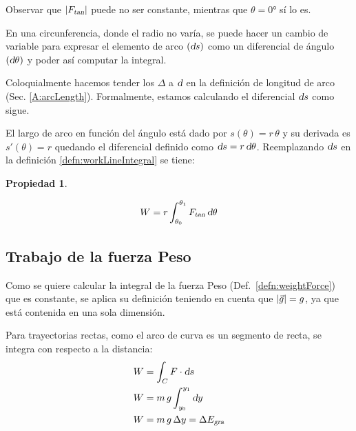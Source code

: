 \documentclass[a5paper,12pt,twoside]{book}
\newtheorem{prop}{{Propiedad}}[chapter]
\begin{document}
Observar que ${\left| {{{F}_\textsl{{tan}}}} \right|}$ puede no ser constante, mientras que $\theta=\ang{0}$ sí lo es.

En una circunferencia, donde el radio no varía, se puede hacer un cambio de variable para expresar el elemento de arco $(\textsl{d} s)$ como un diferencial de ángulo $(\textsl{d} \theta)$ y poder así computar la integral.

Coloquialmente hacemos tender los $\Delta$ a $\textsl{d}$ en la definición de longitud de arco (Sec. \ref{A:arcLength}). Formalmente, estamos calculando el diferencial $\textsl{d} s$ como sigue.

El largo de arco en función del ángulo está dado por $s(\theta) = r \, \theta$ y su derivada es $s'(\theta) = r$ quedando el diferencial definido como $\textsl{d} s = r \, \textsl{d} \theta$. Reemplazando $\textsl{d} s$ en la definición \ref{defn:workLineIntegral} se tiene:

\begin{mdframed}[style=MyFrame1]
    \begin{prop}
        \label{prop:workOnCircumference}
    \end{prop}
    \begin{equation*}
        W = r \int_{\theta_0}^{\theta_1} {{F}_\textsl{{tan}}} \, \textsl{d} \theta
    \end{equation*}
\end{mdframed}


\subsection{Trabajo de la fuerza Peso}

Como se quiere calcular la integral de la fuerza Peso (Def.\ \ref{defn:weightForce}) que es constante, se aplica su definición teniendo en cuenta que ${\left| {\Vec{g}} \right|} = g$, ya que está contenida en una sola dimensión.

\begin{center}
    \def\svgwidth{0.8\linewidth}
    
\end{center}

Para trayectorias rectas, como el arco de curva es un segmento de recta, se integra con respecto a la distancia:
\begin{align*}
    W &= \int_C F \cdot \textsl{d} s
    \\
    W &= m \, g \int_{y_0}^{y_1} \textsl{d} y
    \\
    W &= m \, g \, \Delta y = \Delta {{E}_\textsl{{gra}}}
\end{align*}
\end{document}
